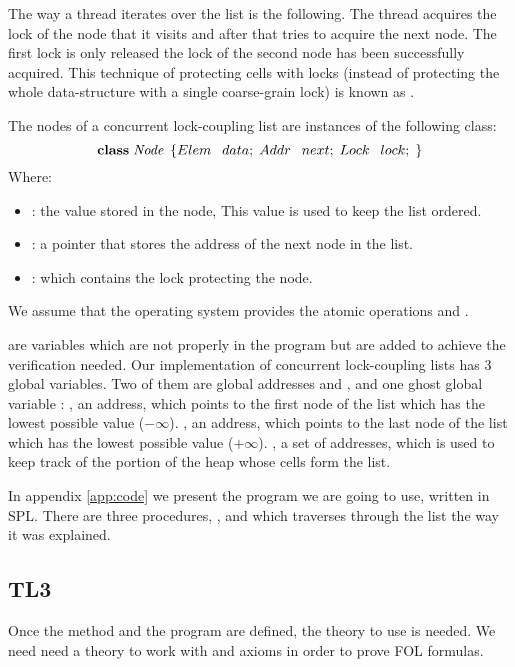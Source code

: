 The way a thread iterates over the list is the following.
%
The thread acquires the lock of the node
that it visits and after that tries to acquire the next node.
The first lock is only released the lock of the
second node has been successfully acquired.
%
This technique of protecting cells with locks (instead of protecting
the whole data-structure with a single coarse-grain lock) is known as
.


The nodes of a concurrent lock-coupling list are instances of the following 
\ListNode class:
%
\[
	  \textbf{class} \;\mathit{Node}  \;\left\{
				Elem \:\;\; data; \;
				Addr \:\;\; next; \;
				Lock \:\;\; lock; \;
		\right\}
\]
%
Where:
\begin{itemize}
		\item \fData: the value stored in the node, This value is used to keep 
			the list ordered.
		\item \fNext: a pointer that stores the address of the next node in 
			the list.
		\item \fLock: which contains the lock protecting the node.
\end{itemize}

We assume that the operating system provides the atomic operations \fLock 
and \fUnlock. 

 are variables which are not properly in the program but are added to 
achieve the verification needed.
Our implementation of concurrent lock-coupling lists has 3 global variables.
%
Two of them are global addresses \head and \tail, and one ghost global variable \region:
\head, an address, which points to the first node of the list which has the lowest possible value ($-\infty$).
%
\tail, an address, which points to the last node of the list  which has the lowest possible value ($+\infty$).
%
\region, a set of addresses, which is used to keep track of the portion of the heap whose cells form the list.



In appendix \ref{app:code} we present the program we are going to use, written in \gls{SPL}. 
%
There are three procedures, \Search, \Insert and \Remove which traverses through the list the way it was explained.



\subsection{TL3}
Once the method and the program are defined, the theory to use is needed. 
%
We need need a theory to work with and axioms in order to prove \gls{FOL} formulas.


